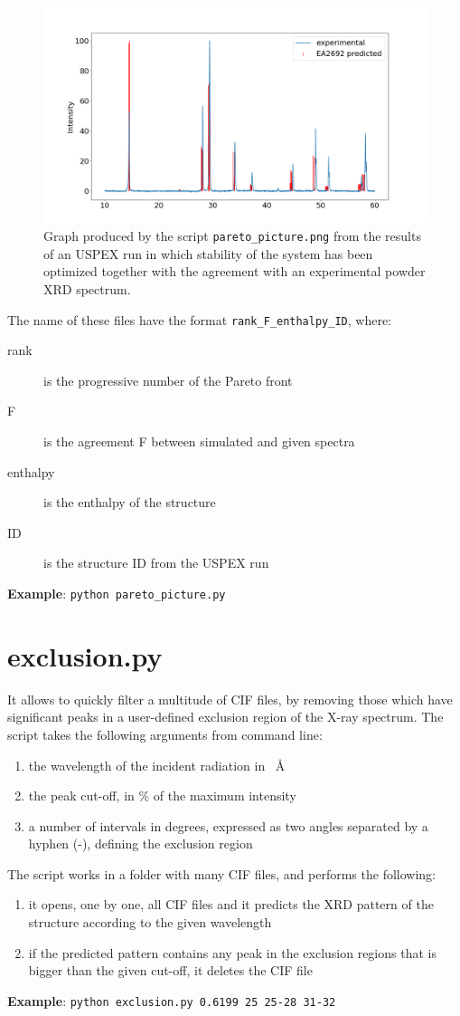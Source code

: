 \documentclass{article}
\begin{document}
\begin{figure}
	\centering
	\includegraphics[width=\textwidth]{1_0.210_0.000_EA2692.png}
	\caption{Graph produced by the script \texttt{pareto\_picture.png} from the results of an USPEX run in which stability of the system  has been optimized together with the agreement with an experimental powder XRD spectrum.}
	\label{fig:comparison}
\end{figure}
The name of these files have the format \texttt{rank\_F\_enthalpy\_ID}, where:
\begin{description}
	\item[rank] is the progressive number of the Pareto front
	\item[F] is the agreement F between simulated and given spectra
	\item[enthalpy] is the enthalpy of the structure
	\item[ID] is the structure ID from the USPEX run
\end{description}
\textbf{Example}: \texttt{python pareto\_picture.py}

\section{exclusion.py}
It allows to quickly filter a multitude of CIF files, by removing those which have significant peaks in a user-defined exclusion region of the X-ray spectrum. The script takes the following arguments from command line:
\begin{enumerate}
	\item the wavelength of the incident radiation in \SI{}{\angstrom}
	\item the peak cut-off, in \% of the maximum intensity
	\item a number of intervals in degrees, expressed as two angles separated by a hyphen (-), defining the exclusion region
\end{enumerate}
The script works in a folder with many CIF files, and performs the following:
\begin{enumerate}
	\item it opens, one by one, all CIF files and it predicts the XRD pattern of the structure according to the given wavelength
	\item if the predicted pattern contains any peak in the exclusion regions that is bigger than the given cut-off, it deletes the CIF file
\end{enumerate}
\textbf{Example}: \texttt{python exclusion.py 0.6199 25 25-28 31-32}
\end{document}

